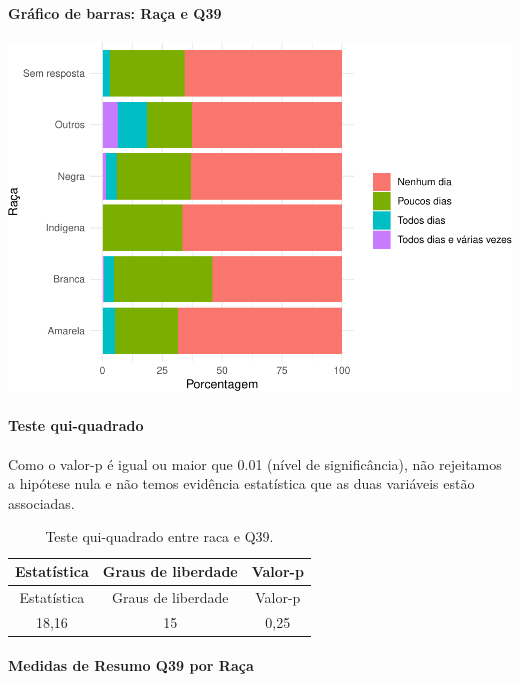 \documentclass[]{article}
\let\oldparagraph\paragraph
\renewcommand{\paragraph}[1]{\oldparagraph{#1}\mbox{}}
\begin{document}
\hypertarget{gruxe1fico-de-barras-rauxe7a-e-q39}{%
\paragraph{Gráfico de barras: Raça e Q39}\label{gruxe1fico-de-barras-rauxe7a-e-q39}}

\begin{center}\includegraphics[width=0.75\linewidth]{relatorio_covid19_files/figure-latex/unnamed-chunk-1518-1} \end{center}

\hypertarget{teste-qui-quadrado-130}{%
\paragraph{Teste qui-quadrado}\label{teste-qui-quadrado-130}}

Como o valor-p é igual ou maior que 0.01 (nível de significância), não rejeitamos a hipótese nula e não temos evidência estatística que as duas variáveis estão associadas.

\begin{longtable}[]{@{}ccc@{}}
\caption{\label{tab:unnamed-chunk-1520}Teste qui-quadrado entre raca e Q39.}\tabularnewline
\toprule
Estatística & Graus de liberdade & Valor-p\tabularnewline
\midrule
\endfirsthead
\toprule
Estatística & Graus de liberdade & Valor-p\tabularnewline
\midrule
\endhead
18,16 & 15 & 0,25\tabularnewline
\bottomrule
\end{longtable}

\cleardoublepage

\hypertarget{medidas-de-resumo-q39-por-rauxe7a}{%
\paragraph{Medidas de Resumo Q39 por Raça}\label{medidas-de-resumo-q39-por-rauxe7a}}
\end{document}
